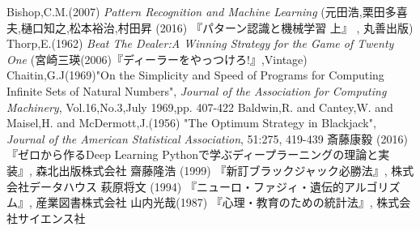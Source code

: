\begin{thebibliography}{9}
   Bishop,C.M.(2007) {\it{Pattern Recognition and Machine Learning}} (元田浩,栗田多喜夫,樋口知之,松本裕治,村田昇 (2016) 『パターン認識と機械学習 上』 , 丸善出版)
   Thorp,E.(1962) {\it{Beat The Dealer:A Winning Strategy for the Game of Twenty One}} (宮崎三瑛(2006)『ディーラーをやっつけろ!』,Vintage)
   Chaitin,G.J(1969)"On the Simplicity and Speed of Programs for Computing Infinite Sets of Natural Numbers", {\it{Journal of the Association for Computing Machinery}}, Vol.16,No.3,July 1969,pp. 407-422
   Baldwin,R. and Cantey,W. and Maisel,H. and McDermott,J.(1956) "The Optimum Strategy in Blackjack", {\it{Journal of the American Statistical Association}}, 51:275, 419-439
   斎藤康毅 (2016) 『ゼロから作るDeep Learning Pythonで学ぶディープラーニングの理論と実装』, 森北出版株式会社
   齋藤隆浩 (1999) 『新訂ブラックジャック必勝法』, 株式会社データハウス
   萩原将文 (1994) 『ニューロ・ファジィ・遺伝的アルゴリズム』, 産業図書株式会社
   山内光哉(1987) 『心理・教育のための統計法』, 株式会社サイエンス社
\end{thebibliography}
